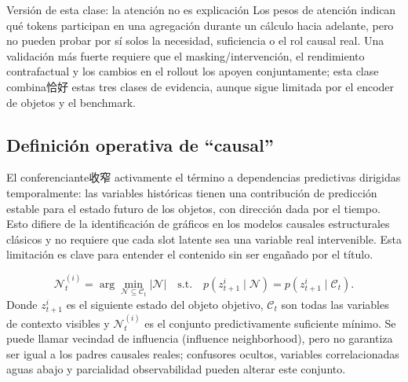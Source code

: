 

\begin{warningbox}{Versión de esta clase: la atención no es explicación}
Los pesos de atención indican qué tokens participan en una agregación durante un cálculo hacia adelante, pero no pueden probar por sí solos la necesidad, suficiencia o el rol causal real. Una validación más fuerte requiere que el masking/intervención, el rendimiento contrafactual y los cambios en el rollout los apoyen conjuntamente; esta clase combina恰好 estas tres clases de evidencia, aunque sigue limitada por el encoder de objetos y el benchmark.
\end{warningbox}

\subsection{Definición operativa de ``causal''}

El conferenciante收窄 activamente el término a dependencias predictivas dirigidas temporalmente: las variables históricas tienen una contribución de predicción estable para el estado futuro de los objetos, con dirección dada por el tiempo. Esto difiere de la identificación de gráficos en los modelos causales estructurales clásicos y no requiere que cada slot latente sea una variable real intervenible. Esta limitación es clave para entender el contenido sin ser engañado por el título.


\[
\mathcal{N}_t^{(i)}
=\arg\min_{\mathcal{N}\subseteq\mathcal{C}_t}
|\mathcal{N}|
\quad\text{s.t.}\quad
p(z_{t+1}^i\mid\mathcal{N})
=p(z_{t+1}^i\mid\mathcal{C}_t).
\]
Donde $z_{t+1}^i$ es el siguiente estado del objeto objetivo, $\mathcal{C}_t$ son todas las variables de contexto visibles y $\mathcal{N}_t^{(i)}$ es el conjunto predictivamente suficiente mínimo. Se puede llamar vecindad de influencia (influence neighborhood), pero no garantiza ser igual a los padres causales reales; confusores ocultos, variables correlacionadas aguas abajo y parcialidad observabilidad pueden alterar este conjunto.

